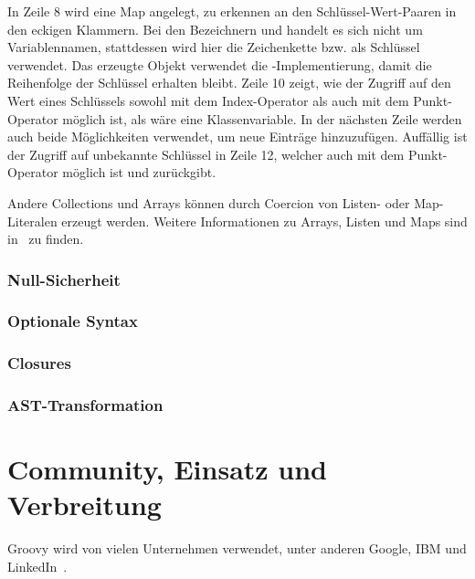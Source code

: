 	In Zeile 8 wird eine Map angelegt, zu erkennen an den Schlüssel-Wert-Paaren in den eckigen Klammern.
	Bei den Bezeichnern  und  handelt es sich nicht um Variablennamen, stattdessen wird hier die Zeichenkette  bzw.  als Schlüssel verwendet.
	Das erzeugte Objekt verwendet die -Implementierung, damit die Reihenfolge der Schlüssel erhalten bleibt.
	Zeile 10 zeigt, wie der Zugriff auf den Wert eines Schlüssels sowohl mit dem Index-Operator als auch mit dem Punkt-Operator möglich ist, als wäre  eine Klassenvariable.
	In der nächsten Zeile werden auch beide Möglichkeiten verwendet, um neue Einträge hinzuzufügen.
	Auffällig ist der Zugriff auf unbekannte Schlüssel in Zeile 12, welcher auch mit dem Punkt-Operator möglich ist und  zurückgibt.

	Andere Collections und Arrays können durch Coercion von Listen- oder Map-Literalen erzeugt werden.
	Weitere Informationen zu Arrays, Listen und Maps sind in~\cite[{Abs.} 7.-9.]{groovy-lang:syntax} zu finden.

	\subsubsection{Null-Sicherheit}

	\subsubsection{Optionale Syntax}\label{subsubsec:optionale-syntax}

	\subsubsection{Closures}\label{subsubsec:closures}

	\subsubsection{AST-Transformation}


	\section{Community, Einsatz und Verbreitung}\label{sec:community}

	Groovy wird von vielen Unternehmen verwendet, unter anderen Google, IBM und LinkedIn~\cite{groovy-lang:main,wiki:Groovy}.

